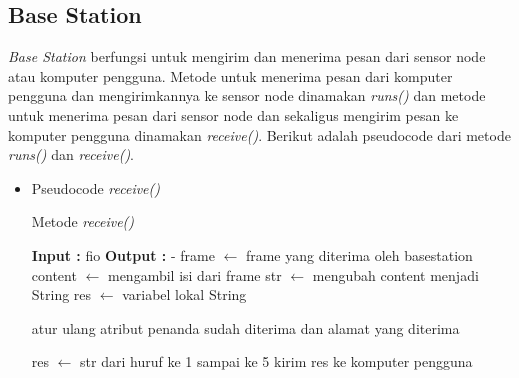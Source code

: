 \subsection{Base Station}
{\it Base Station} berfungsi untuk mengirim dan menerima pesan dari sensor node atau komputer pengguna. Metode untuk menerima pesan dari komputer
pengguna dan mengirimkannya ke sensor node dinamakan {\it runs()} dan metode untuk menerima pesan dari sensor node dan sekaligus mengirim pesan ke komputer pengguna dinamakan {\it receive()}. Berikut adalah pseudocode dari metode {\it runs()} dan {\it receive()}.
\begin{itemize}
	\item Pseudocode {\it receive()}\\
	\begin{algorithm}[htbp]
	\label{alg:receive}
		\caption{Metode {\it receive()}}
		\begin{algorithmic}[1]
		\State \textbf{Input  :} fio
		\State \textbf{Output :} -
    		\State frame $\leftarrow$ frame yang diterima oleh basestation
    		\try
    			\State content $\leftarrow$ mengambil isi dari frame
    			\State str $\leftarrow$ mengubah content menjadi String
    			\State res $\leftarrow$ variabel lokal String
\end{algorithmic}
\end{algorithm}

\begin{algorithm}[H]
\begin{algorithmic}
    						\State atur ulang atribut penanda sudah diterima dan alamat yang diterima
    					\EndIf

    				\State res $\leftarrow$ str dari huruf ke 1 sampai ke 5
    				\try
    					\State kirim res ke komputer pengguna
    				\endtry
    			\EndIf	


\end{algorithmic}
\end{algorithm}
\end{itemize}
